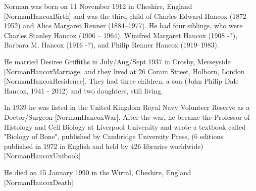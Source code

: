 
Norman was born on 11 November 1912 in Cheshire, England [NormanHancoxBirth] and was the third child of  Charles Edward Hancox (1872 --1952) and Alice Margaret Renner (1884--1977).  He had four siblings, who were Charles Stanley Hancox (1906 -- 1964), Winifred Margaret Hancox (1908 -?), Barbara M. Hancox (1916 -?), and Philip Renner Hancox (1919--1983).

He married Desiree Griffiths in July/Aug/Sept 1937 in Crosby, Merseyside [NormanHancoxMarriage] and they lived at 26 Coram Street, Holborn, London [NormanHancoxResidence]. They had three children,  a son (John Philip Dale Hancox, 1941 - 2012) and two daughters, still living.

In 1939 he was listed in the United Kingdom Royal Navy Volunteer Reserve as a  Doctor/Surgeon [NormanHancoxWar].  After the war, he became the Professor of Histology and Cell Biology at Liverpool University and wrote a textbook called "Biology of Bone", published by Cambridge University Press, (6 editions published in 1972 in English and held by 426 libraries worldwide)[NormanHancoxUnibook]

He died on 15 January 1990 in the	Wirral, Cheshire, England [NormanHancoxDeath]


